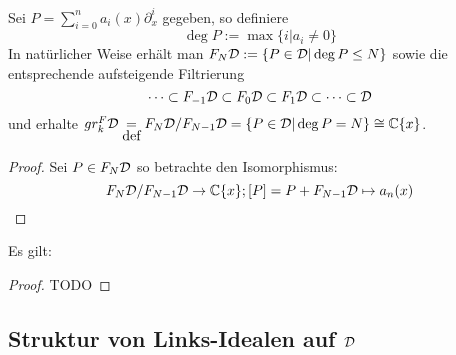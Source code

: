 \begin{defn}
  Sei $P=\sum_{i=0}^na_i(x)\partial_x^i$ gegeben, so definiere 
  \[
    \deg P:=\max\{i|a_i\neq 0\}
  \]
  In natürlicher Weise erhält man $F_N\mathcal{D}:=\{P\in\mathcal{D}|\deg P\leq N\}$ sowie die
  entsprechende aufsteigende Filtrierung
  \[
    \cdots\subset F_{-1}\mathcal{D}\subset F_{0}\mathcal{D}\subset
    F_{1}\mathcal{D}\subset\cdots\subset\mathcal{D}
  \]
  und erhalte $gr_k^F\mathcal{D}\underset{\mbox{def}}{=}F_N\mathcal{D}\slash F_{N-1}\mathcal{D}
  =\{P\in\mathcal{D}|\deg P=N\}\cong\mathbb{C}\{x\}$.
\end{defn}

\begin{proof}
  Sei $P\in F_N\mathcal{D}$ so betrachte den Isomorphismus:
  \[
    F_N\mathcal{D}\slash F_{N-1}\mathcal{D}\rightarrow \mathbb{C}\{x\}; [P]=P+F_{N-1}\mathcal{D}\mapsto a_n(x)
  \]
\end{proof}

\begin{prop}
  Es gilt:
  \begin{center}
  \end{center}
\end{prop}
\begin{proof} TODO
  \begin{comment}
    Treffen?
  \end{comment}
\end{proof}

\begin{comment}
  \subsection{Weyl Algebra als Graduierter Ring}
  Sei $A$ nun einer der drei Koeffizienten Ringe, welche zuvor behandelt
  wurden.  Der Ring $A<\partial_x>$ kommt zusammen mit einer aufsteigenden
  Filtrierung, welche wir mit $F(A<\partial_x)$ bezeichen werden.  Sei $P$ ein
  bzgl. \ref{prop:weyl_eindeutige_schreibung} minimal geschriebener Operator,
  so ist $P$ in $F_k$ falls der maximale Grad von $\partial_x$ in $P$ kleiner
  oder gleich $k$. So definiere den Grad $deg P$ von $P$ als die Eindeutige
  ganze Zahl $k$ mit $P\in F_kA<\partial_x>\slash F_{k-1}<\partial_x>$

  Unabhängigkeit von Schreibung wird in Sabbah Script behauptet
\end{comment}

\subsection{Struktur von Links-Idealen auf $\mathcal{D}$}

